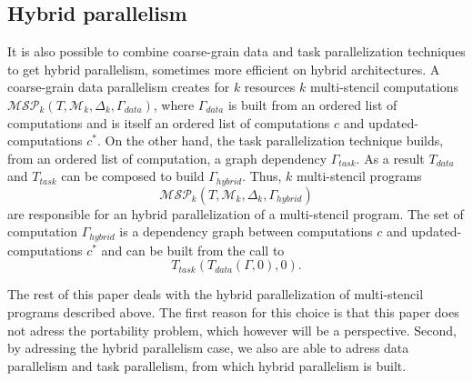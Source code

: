 \subsection{Hybrid parallelism}
It is also possible to combine coarse-grain data and task parallelization techniques to get hybrid parallelism, sometimes more efficient on hybrid architectures. A coarse-grain data parallelism creates for $k$ resources $k$ multi-stencil computations $\mathcal{MSP}_k(T,\mathcal{M}_k,\Delta_k,\Gamma_{data})$, where $\Gamma_{data}$ is built from an ordered list of computations and is itself an ordered list of computations $c$ and updated-computations $c^*$. On the other hand, the task parallelization technique builds, from an ordered list of computation, a graph dependency $\Gamma_{task}$. As a result $T_{data}$ and $T_{task}$ can be composed to build $\Gamma_{hybrid}$. Thus, $k$ multi-stencil programs
\begin{equation*}
\mathcal{MSP}_k(T,\mathcal{M}_k,\Delta_k,\Gamma_{hybrid})
\end{equation*}
are responsible for an hybrid parallelization of a multi-stencil program. The set of computation $\Gamma_{hybrid}$ is a dependency graph between computations $c$ and updated-computations $c^*$ and can be built from the call to 
\begin{equation*}
T_{task}(T_{data}(\Gamma,0),0).
\end{equation*}

The rest of this paper deals with the hybrid parallelization of multi-stencil programs described above. The first reason for this choice is that this paper does not adress the portability problem, which however will be a perspective. Second, by adressing the hybrid parallelism case, we also are able to adress data parallelism and task parallelism, from which hybrid parallelism is built.

